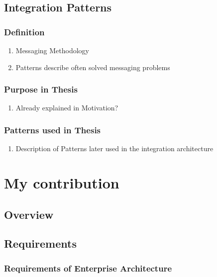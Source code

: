 \documentclass[
     12pt,         %
     a4paper,      %
     BCOR10mm,     %
     DIV14,        %
     ]{scrreprt}
\begin{document}
\section{Integration Patterns}

\subsection{Definition}
\begin{enumerate}
     \item Messaging Methodology
     \item Patterns describe often solved messaging problems
\end{enumerate}

\subsection{Purpose in Thesis}
\begin{enumerate}
     \item Already explained in Motivation?
\end{enumerate}

\subsection{Patterns used in Thesis}
\begin{enumerate}
     \item Description of Patterns later used in the integration architecture
\end{enumerate}

\newpage

\chapter{My contribution}

\section{Overview}

\section{Requirements}

\subsection{Requirements of Enterprise Architecture}
\end{document}

